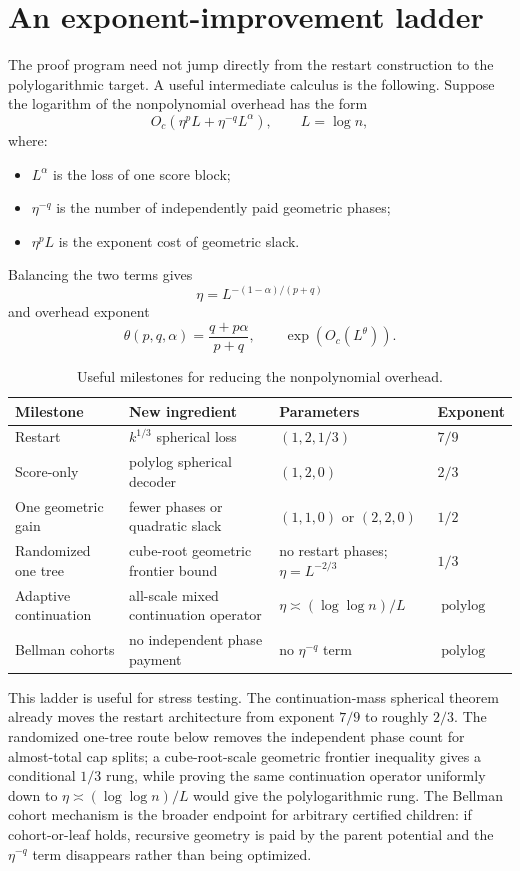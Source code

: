 \documentclass[10pt]{article}
\theoremstyle{definition}
\newcommand{\polylog}{\operatorname{polylog}}
\begin{document}
\section{An exponent-improvement ladder}

The proof program need not jump directly from the restart construction to the polylogarithmic target. A useful intermediate calculus is the following. Suppose the logarithm of the nonpolynomial overhead has the form
\[
   O_c\!\left(\eta^p L+\eta^{-q}L^\alpha\right),
   \qquad L=\log n,
\]
where:
\begin{itemize}
   \item $L^\alpha$ is the loss of one score block;
   \item $\eta^{-q}$ is the number of independently paid geometric phases;
   \item $\eta^p L$ is the exponent cost of geometric slack.
\end{itemize}
Balancing the two terms gives
\[
   \eta=L^{-(1-\alpha)/(p+q)}
\]
and overhead exponent
\[
   \theta(p,q,\alpha)
   =
   \frac{q+p\alpha}{p+q},
   \qquad
   \exp(O_c(L^\theta)).
\]

\begin{table}[t]
   \centering
   \caption{Useful milestones for reducing the nonpolynomial overhead.}
   \label{tab:ladder}
   \begin{tabular}{@{}llll@{}}
      \toprule
      Milestone & New ingredient & Parameters & Exponent \\
      \midrule
      Restart & $k^{1/3}$ spherical loss & $(1,2,1/3)$ & $7/9$ \\
      Score-only & polylog spherical decoder & $(1,2,0)$ & $2/3$ \\
      One geometric gain & fewer phases or quadratic slack & $(1,1,0)$ or $(2,2,0)$ & $1/2$ \\
      Randomized one tree & cube-root geometric frontier bound & no restart phases; $\eta=L^{-2/3}$ & $1/3$ \\
      Adaptive continuation & all-scale mixed continuation operator & $\eta\asymp(\log\log n)/L$ & $\polylog$ \\
      Bellman cohorts & no independent phase payment & no $\eta^{-q}$ term & $\polylog$ \\
      \bottomrule
   \end{tabular}
\end{table}

This ladder is useful for stress testing. The continuation-mass spherical theorem already moves the restart architecture from exponent $7/9$ to roughly $2/3$. The randomized one-tree route below removes the independent phase count for almost-total cap splits; a cube-root-scale geometric frontier inequality gives a conditional $1/3$ rung, while proving the same continuation operator uniformly down to $\eta\asymp(\log\log n)/L$ would give the polylogarithmic rung. The Bellman cohort mechanism is the broader endpoint for arbitrary certified children: if cohort-or-leaf holds, recursive geometry is paid by the parent potential and the $\eta^{-q}$ term disappears rather than being optimized.
\end{document}
